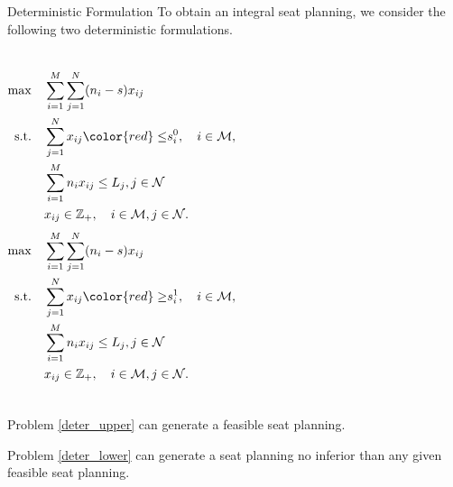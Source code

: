 \begin{frame}{Deterministic Formulation}  %
  To obtain an integral seat planning, we consider the following two deterministic formulations.
  \begin{columns}[c]  %
  \column{5cm}  %
  \scriptsize
  \begin{equation}\label{deter_upper}
    \begin{aligned}
    \max \quad & \sum_{i=1}^{M}  \sum_{j= 1}^{N} (n_i- s) x_{ij} \\
    \text {s.t.} \quad & \sum_{j= 1}^{N} x_{ij} {\color{red} \leq} s_{i}^{0}, \quad i \in \mathcal{M}, \\
    & \sum_{i=1}^{M} n_{i} x_{ij} \leq L_j, j \in \mathcal{N} \\
    & x_{ij} \in \mathbb{Z}_{+}, \quad i \in \mathcal{M}, j \in \mathcal{N}.
    \end{aligned}
  \end{equation}
  \column{5cm}
  \scriptsize
  \begin{equation}\label{deter_lower}
    \begin{aligned}
    \max \quad & \sum_{i=1}^{M}  \sum_{j= 1}^{N} (n_i- s) x_{ij} \\
    \text {s.t.} \quad & \sum_{j= 1}^{N} x_{ij} {\color{red} \geq} s_{i}^{1}, \quad i \in \mathcal{M}, \\
    & \sum_{i=1}^{M} n_{i} x_{ij} \leq L_j, j \in \mathcal{N} \\
    & x_{ij} \in \mathbb{Z}_{+}, \quad i \in \mathcal{M}, j \in \mathcal{N}.
    \end{aligned}
  \end{equation}
  \end{columns}  %
  Problem \eqref{deter_upper} can generate a feasible seat planning.

  Problem \eqref{deter_lower} can generate a seat planning no inferior than any given feasible seat planning.
\end{frame}


